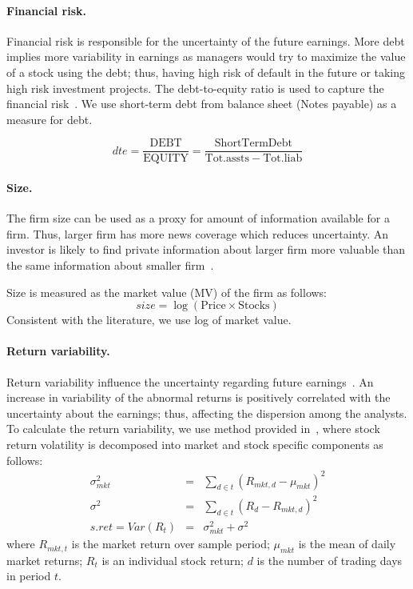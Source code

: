 \paragraph{Financial risk.} Financial risk is responsible for the uncertainty of the future earnings. More debt implies more variability in earnings as managers would try to maximize the value of a stock using the debt; thus, having high risk of default in the future or taking high risk investment projects. The debt-to-equity ratio is used to capture the financial risk~\citep{parkash1995}. We use short-term debt from balance sheet (Notes payable) as a measure for debt.

\begin{equation}
dte=\frac{\mathrm{DEBT}}{\mathrm{EQUITY}}=\frac{\mathrm{ShortTermDebt}}{\mathrm{Tot.assts}-\mathrm{Tot.liab}}
\end{equation}

\paragraph{Size.} The firm size can be used as a proxy for amount of information available for a firm. Thus, larger firm has more news coverage which reduces uncertainty. An investor is likely to find private information about larger firm more valuable than the same information about smaller firm~\citep{bhushan1989}.

Size is measured as the market value (MV) of the firm as follows:
\begin{equation}
size= \log(\mathrm{Price} \times \mathrm{Stocks})
\end{equation}
Consistent with the literature, we use log of market value.


\paragraph{Return variability.}
Return variability influence the uncertainty regarding future earnings~\citep{diether2002,henley2003}. An increase in variability of the abnormal returns is positively correlated with the uncertainty about the earnings; thus, affecting the dispersion among the analysts. To calculate the return variability, we use method provided in~\cite{sousa2008}, where stock return volatility is decomposed into market and stock specific components as follows:
\begin{eqnarray}
\sigma^2_{mkt}&=&\sum_{d\in t} (R_{mkt,d}-\mu_{mkt})^2 \nonumber \\
\sigma^2&=&\sum_{d \in t} (R_{d}-R_{mkt,d})^2 \nonumber \\
s.ret=Var(R_{t})&=&\sigma^2_{mkt}+\sigma^2 \label{ch4-eq:ret.vol}
\end{eqnarray}
where $R_{mkt,t}$ is the market return over sample period; $\mu_{mkt}$ is the mean of daily market returns; $R_{t}$ is an individual stock return; $d$ is the number of trading days in period $t$.

